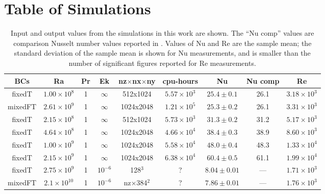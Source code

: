 \documentclass[aps, pre, onecolumn, nofootinbib, notitlepage, groupedaddress, amsfonts, amssymb, amsmath, longbibliography]{revtex4-1}
\begin{document}


\appendix
\section{Table of Simulations}
\label{app:table}


\begin{table}[ht]
\caption{
	Input and output values from the simulations in this work are shown.
	The ``Nu comp'' values are comparison Nusselt number values reported in \cite{zhu&all2018}.
	Values of Nu and Re are the sample mean; the standard deviation of the sample mean is shown for Nu measurements, and is smaller than the number of significant figures reported for Re measurements.
}
\setlength{\tabcolsep}{12pt}
\label{table:speed}
\begin{center}
\begin{tabularx}{\textwidth}{c c c c c c c c c}
\hline																	
BCs	&	Ra	&	Pr	&	Ek	&	nz$\times$nx$\times$ny	&	cpu-hours &	Nu	&	Nu comp	&	Re \\
\hline
fixedT	&	$1.00 \times 10^8$	&	1	&	$\infty$	&	512x1024	&	$5.57 \times 10^3$	&	$25.4 \pm 0.1$	&	26.1	&	$3.18 \times 10^3$ \\
mixedFT	&	$2.61 \times 10^9$	&	1	&	$\infty$	&	1024x2048	&	$1.21 \times 10^5$	&	$25.3 \pm 0.2$	&	26.1	&	$3.31 \times 10^3$ \\
fixedT	&	$2.15 \times 10^8$	&	1	&	$\infty$	&	512x1024	&	$5.73 \times 10^3$	&	$31.3 \pm 0.2$	&	31.2	&	$5.17 \times 10^3$ \\
fixedT	&	$4.64 \times 10^8$	&	1	&	$\infty$	&	1024x2048	&	$4.66 \times 10^4$	&	$38.4 \pm 0.3$	&	38.9	&	$8.60 \times 10^3$ \\
fixedT	&	$1.00 \times 10^9$	&	1	&	$\infty$	&	1024x2048	&	$5.58 \times 10^4$	&	$48.0 \pm 0.4$	&	48.3	&	$1.33 \times 10^4$ \\
fixedT	&	$2.15 \times 10^9$	&	1	&	$\infty$	&	1024x2048	&	$6.38 \times 10^4$	&	$60.4 \pm 0.5$	&	61.1	&	$1.99 \times 10^4$ \\
\hline																	
\hline																	
fixedT	&	$2.75 \times 10^9$		&	1	&	$10^{-6}$	&	128$^3$				&	?					&	$8.04 \pm 0.01$	&	---		&	$1.71 \times 10^3$ \\
mixedFT	&	$2.1 \times 10^{10}$	&	1	&	$10^{-6}$	&	nz$\times$384$^2$	&	?					&	$7.86 \pm 0.01$	&	---		&	$1.76 \times 10^3$ \\
\hline																	
\end{tabularx}
\end{center}
\end{table}
\end{document}
